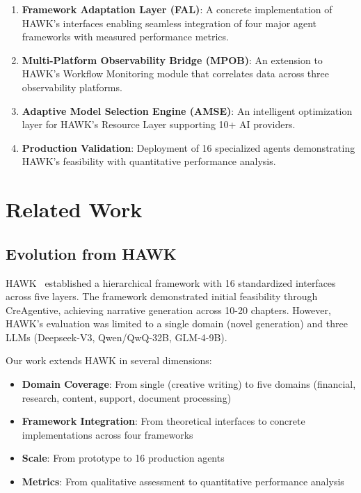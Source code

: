 \documentclass[conference]{IEEEtran}
\begin{document}
\begin{enumerate}
    \item \textbf{Framework Adaptation Layer (FAL)}: A concrete implementation of HAWK's interfaces enabling seamless integration of four major agent frameworks with measured performance metrics.
    
    \item \textbf{Multi-Platform Observability Bridge (MPOB)}: An extension to HAWK's Workflow Monitoring module that correlates data across three observability platforms.
    
    \item \textbf{Adaptive Model Selection Engine (AMSE)}: An intelligent optimization layer for HAWK's Resource Layer supporting 10+ AI providers.
    
    \item \textbf{Production Validation}: Deployment of 16 specialized agents demonstrating HAWK's feasibility with quantitative performance analysis.
\end{enumerate}

\section{Related Work}

\subsection{Evolution from HAWK}

HAWK~\cite{hawk2025} established a hierarchical framework with 16 standardized interfaces across five layers. The framework demonstrated initial feasibility through CreAgentive, achieving narrative generation across 10-20 chapters. However, HAWK's evaluation was limited to a single domain (novel generation) and three LLMs (Deepseek-V3, Qwen/QwQ-32B, GLM-4-9B).

Our work extends HAWK in several dimensions:
\begin{itemize}
    \item \textbf{Domain Coverage}: From single (creative writing) to five domains (financial, research, content, support, document processing)
    \item \textbf{Framework Integration}: From theoretical interfaces to concrete implementations across four frameworks
    \item \textbf{Scale}: From prototype to 16 production agents
    \item \textbf{Metrics}: From qualitative assessment to quantitative performance analysis
\end{itemize}
\end{document}
